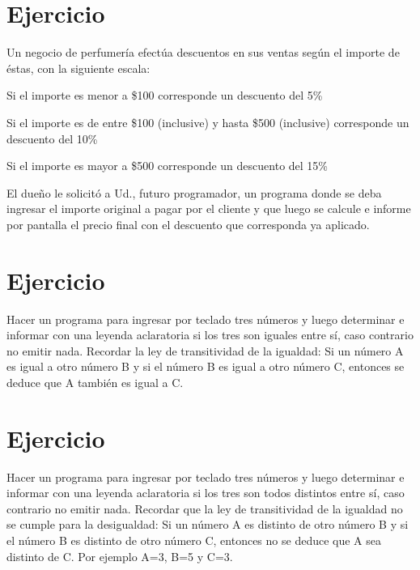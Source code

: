 \documentclass[12pt,a4paper,twoside]{article}
\begin{document}
\newpage

\section{Ejercicio }

\hspace*{1cm}Un negocio de perfumería efectúa descuentos en sus ventas según el importe de éstas, con la siguiente escala:
\begin{list}{•}{}
\item \textbf{} Si el importe es menor a \$100 corresponde un descuento del 5\%
\item \textbf{} Si el importe es de entre \$100 (inclusive) y hasta \$500 (inclusive) corresponde un descuento del 10\%
\item \textbf{} Si el importe es mayor a \$500 corresponde un descuento del 15\%
\end{list}
El dueño le solicitó a Ud., futuro programador, un programa donde se deba ingresar el importe original a pagar por el cliente y que luego se calcule e informe por pantalla el precio final con el descuento que corresponda ya aplicado.

\newpage

\section{Ejercicio }

\hspace*{1cm}Hacer un programa para ingresar por teclado tres números y luego determinar e informar
con una leyenda aclaratoria si los tres son iguales entre sí, caso contrario no emitir nada.
Recordar la ley de transitividad de la igualdad: Si un número A es igual a otro número B y si
el número B es igual a otro número C, entonces se deduce que A también es igual a C.

\newpage

\section{Ejercicio }

\hspace*{1cm}Hacer un programa para ingresar por teclado tres números y luego determinar e informar
con una leyenda aclaratoria si los tres son todos distintos entre sí, caso contrario no emitir
nada.
Recordar que la ley de transitividad de la igualdad no se cumple para la desigualdad: Si un
número A es distinto de otro número B y si el número B es distinto de otro número C,
entonces no se deduce que A sea distinto de C. Por ejemplo A=3, B=5 y C=3.
\end{document}
